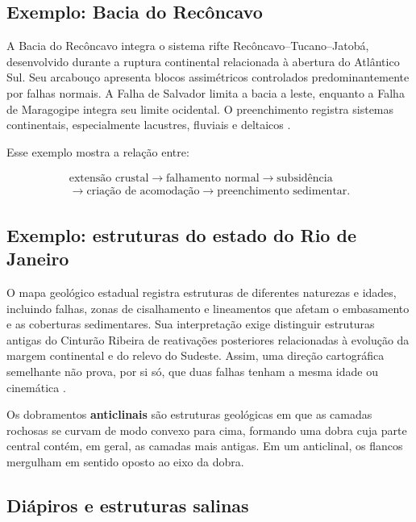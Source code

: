 \subsection{Exemplo: Bacia do Recôncavo}

A Bacia do Recôncavo integra o sistema rifte Recôncavo--Tucano--Jatobá, desenvolvido durante a ruptura continental relacionada à abertura do Atlântico Sul. Seu arcabouço apresenta blocos assimétricos controlados predominantemente por falhas normais. A Falha de Salvador limita a bacia a leste, enquanto a Falha de Maragogipe integra seu limite ocidental. O preenchimento registra sistemas continentais, especialmente lacustres, fluviais e deltaicos \parencite{anp_reconcavo,magnavita2005}.

Esse exemplo mostra a relação entre:

\[
\begin{gathered}
\text{extensão crustal}
\rightarrow
\text{falhamento normal}
\rightarrow
\text{subsidência}
\\[-0.2em]
\rightarrow
\text{criação de acomodação}
\rightarrow
\text{preenchimento sedimentar}.
\end{gathered}
\]

\subsection{Exemplo: estruturas do estado do Rio de Janeiro}

O mapa geológico estadual registra estruturas de diferentes naturezas e idades, incluindo falhas, zonas de cisalhamento e lineamentos que afetam o embasamento e as coberturas sedimentares. Sua interpretação exige distinguir estruturas antigas do Cinturão Ribeira de reativações posteriores relacionadas à evolução da margem continental e do relevo do Sudeste. Assim, uma direção cartográfica semelhante não prova, por si só, que duas falhas tenham a mesma idade ou cinemática \parencite{heilbron2016,fossen2016}.

\begin{definicao}
 Os dobramentos \textbf{anticlinais} são estruturas geológicas em que as camadas rochosas se curvam de modo convexo para cima, formando uma dobra cuja parte central contém, em geral, as camadas mais antigas. Em um anticlinal, os flancos mergulham em sentido oposto ao eixo da dobra.   
\end{definicao}

\subsection{Diápiros e estruturas salinas}

